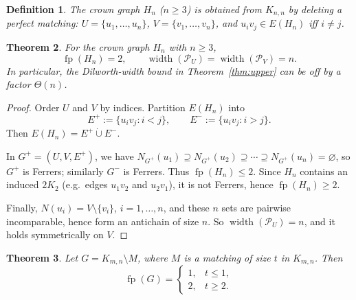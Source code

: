 \documentclass[12pt]{amsart}
\newtheorem{theorem}{Theorem}
\newtheorem{definition}[theorem]{Definition}
\newcommand{\fp}{\operatorname{fp}}
\newcommand{\width}{\operatorname{width}}
\begin{document}
\begin{definition}
The \emph{crown graph} $H_n$ ($n\ge 3$) is obtained from $K_{n,n}$ by deleting a perfect matching:
$U=\{u_1,\dots,u_n\}$, $V=\{v_1,\dots,v_n\}$, and $u_i v_j\in E(H_n)$ iff $i\neq j$.
\end{definition}

\begin{theorem}
\label{thm:crown}
For the crown graph $H_n$ with $n\ge 3$,
\[
\fp(H_n)=2,
\qquad
\width(\mathcal P_U)=\width(\mathcal P_V)=n.
\]
In particular, the Dilworth-width bound in Theorem~\ref{thm:upper} can be off by a factor $\Theta(n)$.
\end{theorem}

\begin{proof}
Order $U$ and $V$ by indices.
Partition $E(H_n)$ into
\[
E^{+}:=\{u_i v_j : i<j\},\qquad
E^{-}:=\{u_i v_j : i>j\}.
\]
Then $E(H_n)=E^+\dot\cup E^-$.

In $G^+=(U,V,E^+)$, we have
$N_{G^+}(u_1)\supseteq N_{G^+}(u_2)\supseteq\cdots\supseteq N_{G^+}(u_n)=\varnothing$,
so $G^+$ is Ferrers; similarly $G^-$ is Ferrers.
Thus $\fp(H_n)\le 2$.
Since $H_n$ contains an induced $2K_2$ (e.g.\ edges $u_1v_2$ and $u_2v_1$), it is not Ferrers, hence $\fp(H_n)\ge 2$.

Finally, $N(u_i)=V\setminus\{v_i\}$, $i=1,\dots, n$, and these $n$ sets are pairwise incomparable, hence form an antichain of size $n$.
So $\width(\mathcal P_U)=n$, and it holds symmetrically on $V$.
\end{proof}

\begin{theorem}
\label{thm:Kmn-minus-matching}
Let $G=K_{m,n}\setminus M$, where $M$ is a matching of size $t$ in $K_{m,n}$.
Then
\[
\fp(G)=
\begin{cases}
1, & t\le 1,\\
2, & t\ge 2.
\end{cases}
\]
\end{theorem}
\end{document}
